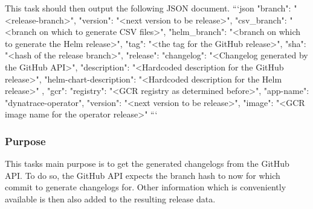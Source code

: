 This task should then output the following JSON document.
```json
    {
    "branch": "<release-branch>",
    "version": "<next version to be release>",
    "csv_branch": "<branch on which to generate CSV files>",
    "helm_branch": "<branch on which to generate the Helm release>",
    "tag": "<the tag for the GitHub release>",
    "sha": "<hash of the release branch>",
    "release": {
        "changelog": "<Changelog generated by the GitHub API>",
        "description": "<Hardcoded description for the GitHub release>",
        "helm-chart-description": "<Hardcoded description for the Helm release>"
    },
    "gcr": {
        "registry": "<GCR registry as determined before>",
        "app-name": "dynatrace-operator",
        "version": "<next version to be release>",
        "image": "<GCR image name for the operator release>"
    }
}
```

\subsubsection{Purpose}\label{subsubsec:get-release-information-purpose}

This tasks main purpose is to get the generated changelogs from the GitHub API.
To do so, the GitHub API expects the branch hash to now for which commit to generate changelogs for.
Other information which is conveniently available is then also added to the resulting release data.
